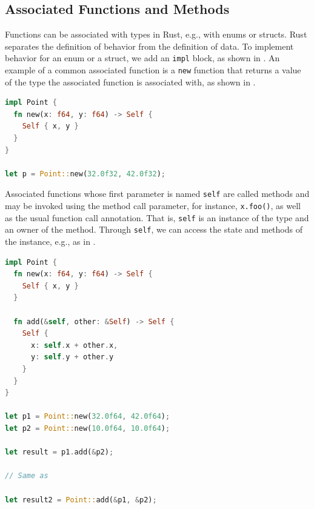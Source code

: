 \documentclass[paper=a4,%
  twoside,%
  BCOR4mm,%
  abstract=true,%
  toc=bibliography,%
  chapterprefix=true,%
  toc=bibliographynumbered,%
  open=right,%
  english,%
  pagesize=pdftex]{scrreprt}
\begin{document}
\subsection{Associated Functions and Methods}
Functions can be associated with types in Rust, e.g., with enums or structs. Rust separates the definition of behavior from the definition of data. To implement behavior for an enum or a struct, we add an \lstinline{impl} block, as shown in . An example of a common associated function is a \lstinline{new} function that returns a value of the type the associated function is associated with, as shown in .

\begin{lstlisting}[language=Rust, style=boxed, caption={Associating behavior with the \lstinline{Point} data type defined in \Cref{lst:example-struct-enum}}, label=lst:example-associated-function]
impl Point {
  fn new(x: f64, y: f64) -> Self {
    Self { x, y }
  }
}

let p = Point::new(32.0f32, 42.0f32);
\end{lstlisting}

Associated functions whose first parameter is named \lstinline{self} are called methods and may be invoked using the method call parameter, for instance, \lstinline{x.foo()}, as well as the usual function call annotation. That is, \lstinline{self} is an instance of the type and an owner of the method. Through \lstinline{self}, we can access the state and methods of the instance, e.g., as in .

\begin{lstlisting}[language=Rust, style=boxed, caption={Defining a method on \lstinline{Point} data type from \Cref{lst:example-struct-enum}}, label=lst:example-method]
impl Point {
  fn new(x: f64, y: f64) -> Self {
    Self { x, y }
  }

  fn add(&self, other: &Self) -> Self {
    Self {
      x: self.x + other.x,
      y: self.y + other.y
    }
  }
}

let p1 = Point::new(32.0f64, 42.0f64);
let p2 = Point::new(10.0f64, 10.0f64);

let result = p1.add(&p2);

// Same as

let result2 = Point::add(&p1, &p2);
\end{lstlisting}
\end{document}
